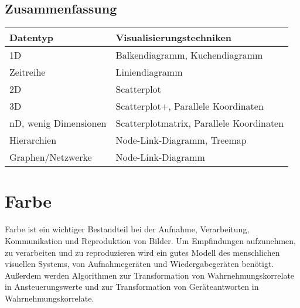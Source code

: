 	\section{Zusammenfassung}
		\begin{table}
			\centering
			\begin{tabular}{l|l}
				\textbf{Datentyp}     & \textbf{Visualisierungstechniken}        \\ \hline
				1D                    & Balkendiagramm, Kuchendiagramm           \\
				Zeitreihe             & Liniendiagramm                           \\
				2D                    & Scatterplot                              \\
				3D                    & Scatterplot+, Parallele Koordinaten      \\
				nD, wenig Dimensionen & Scatterplotmatrix, Parallele Koordinaten \\
				Hierarchien           & Node-Link-Diagramm, Treemap              \\
				Graphen/Netzwerke     & Node-Link-Diagramm
			\end{tabular}
		\end{table}

\chapter{Farbe}
	Farbe ist ein wichtiger Bestandteil bei der Aufnahme, Verarbeitung, Kommunikation und Reproduktion von Bilder. Um Empfindungen aufzunehmen, zu verarbeiten und zu reproduzieren wird ein gutes Modell des menschlichen visuellen Systems, von Aufnahmegeräten und Wiedergabegeräten benötigt. Außerdem werden Algorithmen zur Transformation von Wahrnehmungskorrelate in Ansteuerungswerte und zur Transformation von Geräteantworten in Wahrnehmungskorrelate.

